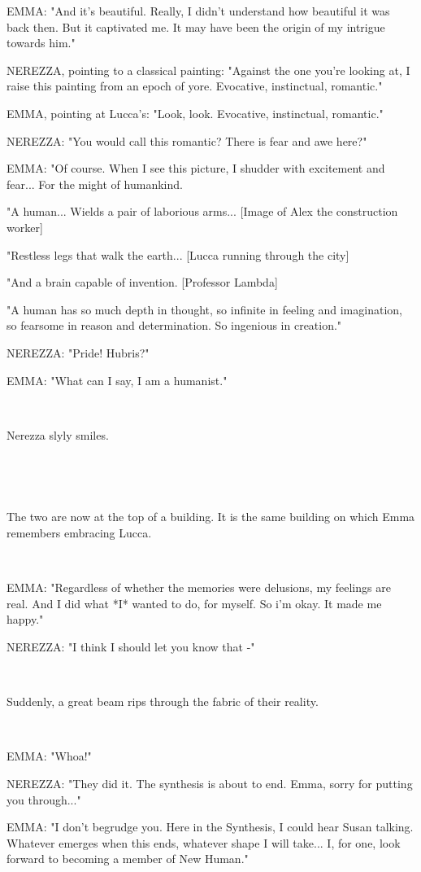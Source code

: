 \documentclass[11pt]{article}
\begin{document}
EMMA: "And it's beautiful.
Really, I didn't understand how beautiful it was back then.
But it captivated me.
It may have been the origin of my intrigue towards him."

NEREZZA, pointing to a classical painting: "Against the one you're looking at, I raise this painting from an epoch of yore. 
Evocative, instinctual, romantic."

EMMA, pointing at Lucca's: "Look, look. Evocative, instinctual, romantic."

NEREZZA: "You would call this romantic? There is fear and awe here?"

EMMA: "Of course. 
When I see this picture, I shudder with excitement and fear...
For the might of humankind.

"A human... Wields a pair of laborious arms... [Image of Alex the construction worker]

"Restless legs that walk the earth... [Lucca running through the city]

"And a brain capable of invention. [Professor Lambda]

"A human has so much depth in thought,
so infinite in feeling and imagination,
so fearsome in reason and determination.
So ingenious in creation."

NEREZZA: "Pride! Hubris?"

EMMA: "What can I say, I am a humanist."

\ 

Nerezza slyly smiles.

\ 

\ 

The two are now at the top of a building.
It is the same building on which Emma remembers embracing Lucca. 

\ 

EMMA: "Regardless of whether the memories were delusions, my feelings are real.
And I did what *I* wanted to do, for myself. 
So i'm okay.
It made me happy."

NEREZZA: "I think I should let you know that -"

\ 

Suddenly, a great beam rips through the fabric of their reality.

\ 

EMMA: "Whoa!"

NEREZZA: "They did it. 
The synthesis is about to end.
Emma, sorry for putting you through..."

EMMA: "I don't begrudge you. 
Here in the Synthesis, I could hear Susan talking.
Whatever emerges when this ends, whatever shape I will take...
I, for one, look forward to becoming a member of New Human."
\end{document}
